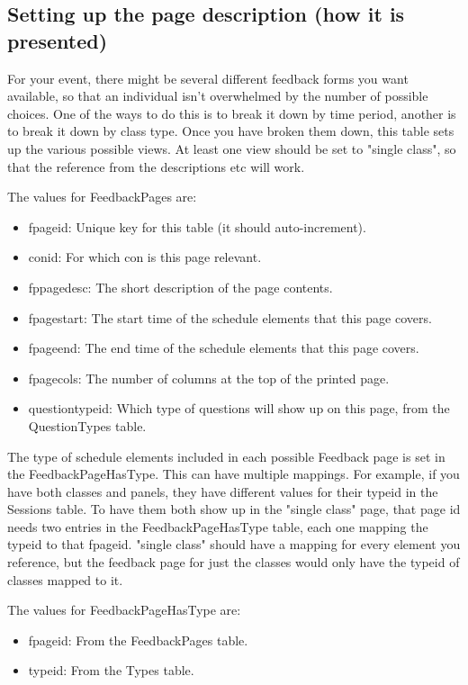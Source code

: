 \documentclass[captions=tablesignature]{scrartcl}
\begin{document}
\subsection{Setting up the page description (how it is presented)}
\label{sec-14-2}
For your event, there might be several different feedback forms you
want available, so that an individual isn't overwhelmed by the
number of possible choices.  One of the ways to do this is to break
it down by time period, another is to break it down by class type.
Once you have broken them down, this table sets up the various
possible views.  At least one view should be set to "single class",
so that the reference from the descriptions etc will work.

The values for FeedbackPages are:
\begin{itemize}
\item fpageid: Unique key for this table (it should auto-increment).
\item conid: For which con is this page relevant.
\item fppagedesc: The short description of the page contents.
\item fpagestart: The start time of the schedule elements that this
page covers.
\item fpageend: The end time of the schedule elements that this page
covers.
\item fpagecols: The number of columns at the top of the printed page.
\item questiontypeid: Which type of questions will show up on this
page, from the QuestionTypes table.
\end{itemize}

The type of schedule elements included in each possible Feedback
page is set in the FeedbackPageHasType.  This can have multiple
mappings.  For example, if you have both classes and panels, they
have different values for their typeid in the Sessions table.  To
have them both show up in the "single class" page, that page id
needs two entries in the FeedbackPageHasType table, each one
mapping the typeid to that fpageid.  "single class" should have a
mapping for every element you reference, but the feedback page for
just the classes would only have the typeid of classes mapped to
it.

The values for FeedbackPageHasType are:
\begin{itemize}
\item fpageid: From the FeedbackPages table.
\item typeid: From the Types table.
\end{itemize}
\end{document}
